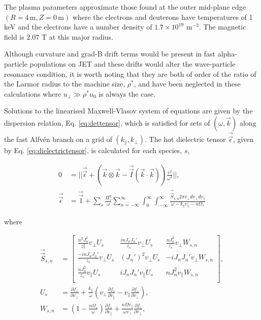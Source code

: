 \documentclass[12pt]{iopart}
\begin{document}
The plasma parameters approximate those found at the outer mid-plane edge
$(R=4\, \mathrm{m}, Z=0\, \mathrm{m})$ where the electrons and deuterons have
temperatures of 1 keV and the electrons have a number density
of $1.7\times 10^{19}$ $\mathrm{m^{-3}}$. The magnetic field is $2.07$
$\mathrm{T}$ at this major radius.

Although curvature and grad-B drift terms would be present in fast
alpha-particle populations on JET and these drifts would alter the wave-particle
resonance condition, it is worth noting that they are both of
order of the ratio of the Larmor radius to the machine size, $\rho^*$,
and have been neglected in these calculations where $u_\bot \gg
\rho^* u_0$ is always the case.

Solutions to the linearised Maxwell-Vlasov system of equations are given by the
dispersion relation, Eq. \ref{eq:dettensor}, which is satisfied for sets of
$(\omega,\vec{k})$ 
along the fast Alfv{\'e}n branch  on a grid of $(k_\parallel, k_\bot)$.
The hot dielectric tensor \cite{Stix} $\vec{\vec{\epsilon}}$, given by Eq.
\ref{eq:dielectrictensor}, is calculated for each species, $s$,

\begin{align}
    0 &= ||\vec{\vec{\epsilon}} + \left(\vec{k} \otimes \vec{k} - \vec{\vec{I}}(\vec{k}\cdot\vec{k})\right) \frac{c^2}{\omega^2}||,\label{eq:dettensor}\\
    \vec{\vec{\epsilon}} &= \vec{\vec{1}} + \sum_s \frac{\Pi_s^2}{\omega}\sum_{n=-\infty}^{\infty}
    \int_0^{\infty}
    \int_{-\infty}^{\infty}\frac{\vec{\vec{S}}_{s,n} 2\pi v_\perp dv_\perp dv_\parallel}{\omega - k_\parallel v_\parallel - n \Omega_s}
    \label{eq:dielectrictensor}
\end{align}

\noindent where

\begin{align}
\vec{\vec{S}}_{s,n} &=
\begin{bmatrix}
\frac{n^2J_n^2}{z_s^2}v_\perp U_s & \frac{inJ_nJ_n'}{z_s}v_\perp U_s & \frac{n
  J_n^2}{z_s} v_\perp W_{s,n} \\
\frac{-inJ_nJ_n'}{z_s}v_\perp U_s & (J_n')^2 v_\perp U_s & -iJ_n J_n' v_\perp
  W_{s,n} \\
\frac{nJ_n^2}{z_s}v_\parallel U_s & iJ_nJ_n'v_\parallel U_s & n J_n^2
  v_\parallel W_{s,n} \\
\end{bmatrix}\label{eq:stenor},\\
U_s &= \frac{\partial f_s}{\partial v_\perp} + \frac{k_\parallel}{\omega}  \left(v_\perp \frac{\partial f_s}{\partial v_\parallel} - v_\parallel \frac{\partial f_s}{\partial v_\perp}\right)\label{eq:uterm},\\
  W_{s,n} &=\left(1- \frac{n\Omega_s}{\omega}\right)\frac{\partial f_s}{\partial v_\parallel} + \frac{n\Omega v_\parallel}{\omega v_\perp}\frac{\partial f_s}{\partial v_\perp}\label{eq:wterm},
\end{align}
\end{document}
